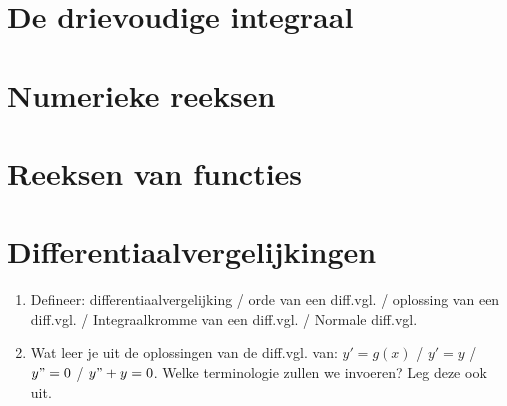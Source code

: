 \documentclass[12pt]{article}
\begin{document}
    \section{De drievoudige integraal}
    \section{Numerieke reeksen}
    \section{Reeksen van functies}
    \section{Differentiaalvergelijkingen}
    \begin{enumerate}
        \item Defineer: differentiaalvergelijking / orde van een diff.vgl. / oplossing van een diff.vgl. / Integraalkromme van een diff.vgl. / Normale diff.vgl.
        \item Wat leer je uit de oplossingen van de diff.vgl. van: $y'=g(x)$ / $y'=y$ / $y"=0$ / $y"+y=0$. Welke terminologie zullen we invoeren? Leg deze ook uit.
    \end{enumerate}
\end{document}
